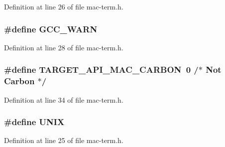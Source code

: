 Definition at line 26 of file mac-\/term.\+h.

\hypertarget{mac-term_8h_a92b0d5b27a6885d223fdad4315cc49c1}{
\subsubsection[{G\+C\+C\+\_\+\+W\+A\+R\+N}]{\setlength{\rightskip}{0pt plus 5cm}\#define G\+C\+C\+\_\+\+W\+A\+R\+N}}\label{mac-term_8h_a92b0d5b27a6885d223fdad4315cc49c1}


Definition at line 28 of file mac-\/term.\+h.

\hypertarget{mac-term_8h_a8601b9b36b5d7d40e6d42c0e04dd936c}{
\subsubsection[{T\+A\+R\+G\+E\+T\+\_\+\+A\+P\+I\+\_\+\+M\+A\+C\+\_\+\+C\+A\+R\+B\+O\+N}]{\setlength{\rightskip}{0pt plus 5cm}\#define T\+A\+R\+G\+E\+T\+\_\+\+A\+P\+I\+\_\+\+M\+A\+C\+\_\+\+C\+A\+R\+B\+O\+N~0 	/$\ast$ Not Carbon $\ast$/}}\label{mac-term_8h_a8601b9b36b5d7d40e6d42c0e04dd936c}


Definition at line 34 of file mac-\/term.\+h.

\hypertarget{mac-term_8h_a2dafe4a81445873e5c3cb0dff7741429}{
\subsubsection[{U\+N\+I\+X}]{\setlength{\rightskip}{0pt plus 5cm}\#define U\+N\+I\+X}}\label{mac-term_8h_a2dafe4a81445873e5c3cb0dff7741429}


Definition at line 25 of file mac-\/term.\+h.

